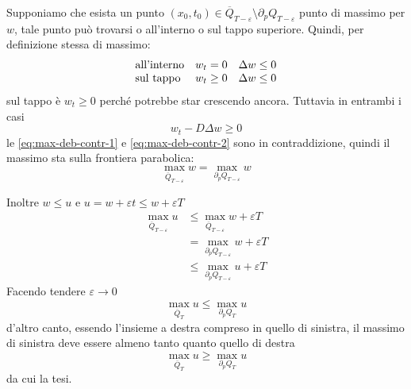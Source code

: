 \begin{dimostrazione}
    Supponiamo che esista un punto $(x_{0},t_{0}) \in \overline{Q}_{T-\varepsilon } \setminus \partial _{p} Q_{T-\varepsilon }$ punto di massimo per $w$, tale punto può trovarsi o all'interno o sul tappo superiore. Quindi, per definizione stessa di massimo:
    \begin{equation*}
        \begin{array}{ l l l }
            \text{all'interno} & w_{t} =0          & \Delta w\leq 0 \\
            \text{sul tappo}   & w_{t} \geq 0 & \Delta w\leq 0
        \end{array}
    \end{equation*}
    sul tappo è $w_{t}\geq 0$ perché potrebbe star crescendo ancora. Tuttavia in entrambi i casi
    \begin{equation}
        w_{t} -D\Delta w\geq 0
        \label{eq:max-deb-contr-2}
    \end{equation}
    le \eqref{eq:max-deb-contr-1} e \eqref{eq:max-deb-contr-2} sono in contraddizione, quindi il massimo sta sulla frontiera parabolica:
    \begin{equation*}
        \max_{\overline{Q}_{T-\varepsilon }} w=\max_{\partial _{p} Q_{T-\varepsilon }} w
    \end{equation*}

    Inoltre $w\leq u$ e $u=w+\varepsilon t\leq w+\varepsilon T$
    \begin{align*}
        \max_{\overline{Q}_{T-\varepsilon }} u & \leq \max_{\overline{Q}_{T-\varepsilon }} w+\varepsilon T    \\
                                               & =\max_{\partial _{p} Q_{T-\varepsilon }} w+\varepsilon T          \\
                                               & \leq \max_{\partial _{p} Q_{T-\varepsilon }} u+\varepsilon T
    \end{align*}
    Facendo tendere $\varepsilon \rightarrow 0$
    \begin{equation*}
        \max_{\overline{Q}_{T}} u\leq \max_{\partial _{p} Q_{T}} u
    \end{equation*}
    d'altro canto, essendo l'insieme a destra compreso in quello di sinistra, il massimo di sinistra deve essere almeno tanto quanto quello di destra
    \begin{equation*}
        \max_{\overline{Q}_{T}} u\geq \max_{\partial _{p} Q_{T}} u
    \end{equation*}
    da cui la tesi.
\end{dimostrazione}
